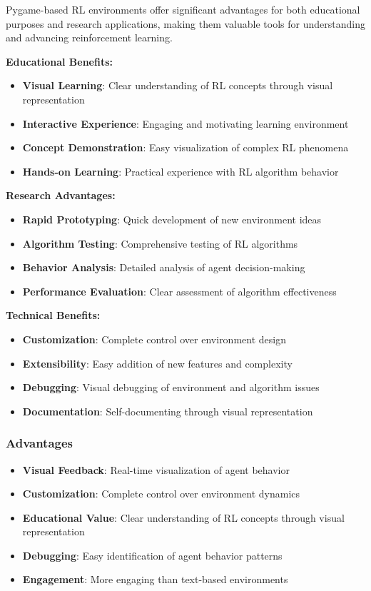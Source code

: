 \documentclass[12pt]{article}
\begin{document}
{{{Pygame-based RL environments offer significant advantages for both educational purposes and research applications, making them valuable tools for understanding and advancing reinforcement learning.

\textbf{Educational Benefits:}
\begin{itemize}
    \item \textbf{Visual Learning}: Clear understanding of RL concepts through visual representation
    \item \textbf{Interactive Experience}: Engaging and motivating learning environment
    \item \textbf{Concept Demonstration}: Easy visualization of complex RL phenomena
    \item \textbf{Hands-on Learning}: Practical experience with RL algorithm behavior
\end{itemize}

\textbf{Research Advantages:}
\begin{itemize}
    \item \textbf{Rapid Prototyping}: Quick development of new environment ideas
    \item \textbf{Algorithm Testing}: Comprehensive testing of RL algorithms
    \item \textbf{Behavior Analysis}: Detailed analysis of agent decision-making
    \item \textbf{Performance Evaluation}: Clear assessment of algorithm effectiveness
\end{itemize}

\textbf{Technical Benefits:}
\begin{itemize}
    \item \textbf{Customization}: Complete control over environment design
    \item \textbf{Extensibility}: Easy addition of new features and complexity
    \item \textbf{Debugging}: Visual debugging of environment and algorithm issues
    \item \textbf{Documentation}: Self-documenting through visual representation
\end{itemize}

\subsubsection{Advantages}

\begin{itemize}
    \item \textbf{Visual Feedback}: Real-time visualization of agent behavior
    \item \textbf{Customization}: Complete control over environment dynamics
    \item \textbf{Educational Value}: Clear understanding of RL concepts through visual representation
    \item \textbf{Debugging}: Easy identification of agent behavior patterns
    \item \textbf{Engagement}: More engaging than text-based environments
\end{itemize}

}}}
\end{document}
